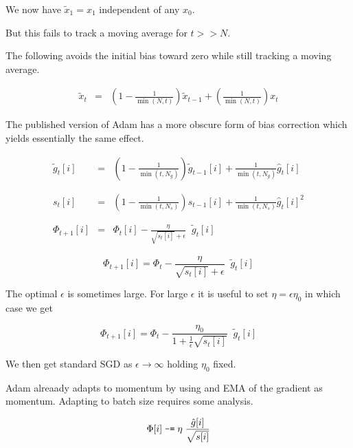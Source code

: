 {\vfill
We now have $\tilde{x}_1 = x_1$ independent of any $x_0$.

\vfill
But this fails to track a moving average for $t >> N$.


The following avoids the initial bias toward zero while still tracking a moving average.

\begin{eqnarray*}
\tilde{x}_t & = & \left(1-\frac{1}{\min(N,t)}\right)\tilde{x}_{t-1} + \left(\frac{1}{\min(N,t)}\right)x_t
\end{eqnarray*}

\vfill
The published version of Adam has a more obscure form of bias correction which yields essentially the same effect.


\begin{eqnarray*}
  \tilde{g}_{t}[i] & = & \left(1-\frac{1}{\min(t,N_g)}\right)\tilde{g}_{t-1}[i] + \frac{1}{\min(t,N_g)} \hat{g}_t[i] \\
  \\
  \\
  s_{t}[i] & = & \left(1-\frac{1}{\min(t,N_s)}\right)s_{t-1}[i] + \frac{1}{\min(t,N_s)} \hat{g}_t[i]^2 \\
  \\
  \\
\Phi_{t+1}[i] & =  & \Phi_t[i] - \frac{\eta}{\sqrt{s_{t}[i]} + \epsilon}\;\;\tilde{g}_{t}[i]
\end{eqnarray*}


$$\Phi_{t+1}[i] =  \Phi_t - \frac{\eta}{\sqrt{s_{t}[i]} + \epsilon}\;\;\tilde{g}_{t}[i]$$

\vfill
The optimal $\epsilon$ is sometimes large.
For large $\epsilon$ it is useful to set $\eta = \epsilon\eta_0$ in which case we get

$$\Phi_{t+1}[i] =  \Phi_t - \frac{\eta_0}{1 + \frac{1}{\epsilon}\sqrt{s_{t}[i]}}\;\;\tilde{g}_{t}[i]$$

\vfill
We then get standard SGD  as $\epsilon \rightarrow \infty$ holding $\eta_0$ fixed.


Adam alreaady adapts to momentum by using and EMA of the gradient as momentum.
Adapting to batch size requires some analysis.

\vfill
$$\Phi[i] \;\mbox{\tt -=} \; \eta\;\frac{\hat{g}[i]}{\sqrt{s[i]}}$$

}
